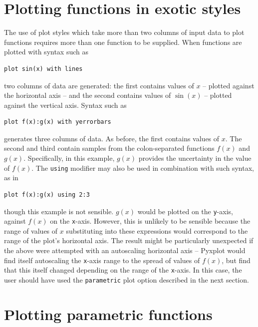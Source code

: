 \section{Plotting functions in exotic styles}

The use of plot styles which take more than two columns of input data to plot
functions requires more than one function to be supplied.  When functions are
plotted with syntax such as

\begin{verbatim}
plot sin(x) with lines
\end{verbatim}

\noindent two columns of data are generated: the first contains values of $x$
-- plotted against the horizontal axis -- and the second contains values of
$\sin(x)$ -- plotted against the vertical axis. Syntax such as

\begin{verbatim}
plot f(x):g(x) with yerrorbars
\end{verbatim}

\noindent generates three columns of data. As before, the first contains values
of $x$. The second and third contain samples from the colon-separated functions
$f(x)$ and $g(x)$. Specifically, in this example, $g(x)$ provides the
uncertainty in the value of $f(x)$.  The {\tt using} modifier may also be used
in combination with such syntax, as in

\begin{verbatim}
plot f(x):g(x) using 2:3
\end{verbatim}

\noindent though this example is not sensible. $g(x)$ would be plotted on the
{\tt y}-axis, against $f(x)$ on the {\tt x}-axis. However, this is unlikely to be
sensible because the range of values of $x$ substituting into these expressions
would correspond to the range of the plot's horizontal axis. The result might
be particularly unexpected if the above were attempted with an autoscaling
horizontal axis -- Pyxplot would find itself autoscaling the {\tt x}-axis range
to the spread of values of $f(x)$, but find that this itself changed depending
on the range of the {\tt x}-axis. In this case, the user should have used the
{\tt parametric} plot option described in the next section.

\section{Plotting parametric functions}
\label{sec:parametric_plotting}

